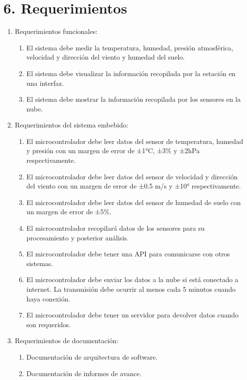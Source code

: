 \documentclass[
11pt, %
]{charter}
\begin{document}
\section{6. Requerimientos}
\label{sec:requerimientos}

\begin{enumerate}
	\item Requerimientos funcionales:
		\begin{enumerate}
			\item El sistema debe medir la temperatura, humedad, presión atmosférica, velocidad y dirección del viento y humedad del suelo.
			\item El sistema debe visualizar la información recopilada por la estación en una interfaz.
			\item El sistema debe mostrar la información recopilada por los sensores en la nube. 
		\end{enumerate}
	\item Requerimientos del sistema embebido:
		\begin{enumerate}
			\item El microcontrolador debe leer datos del sensor de temperatura, humedad y presión con un margen de error de ±1°C, ±3\% y ±2hPa respectivamente.
			\item El microcontrolador debe leer datos del sensor de velocidad y dirección del viento con un margen de error de ±0.5 m/s y ±10° respectivamente.
			\item El microcontrolador debe leer datos del sensor de humedad de suelo con un margen de error de ±5\%.	
			\item El microcontrolador recopilará datos de los sensores para su procesamiento y posterior análisis.
			\item El microcontrolador debe tener una API para comunicarse con otros sistemas.
			\item El microcontrolador debe enviar los datos a la nube si está conectado a internet. La transmisión debe ocurrir al menos cada 5 minutos cuando haya conexión.
			\item El microcontrolador debe tener un servidor para devolver datos cuando son requeridos.
		\end{enumerate}
	\newpage
	\item Requerimientos de documentación:
		\begin{enumerate}
			\item Documentación de arquitectura de software.
			\item Documentación de informes de avance.

\end{enumerate}
\end{enumerate}
\end{document}
